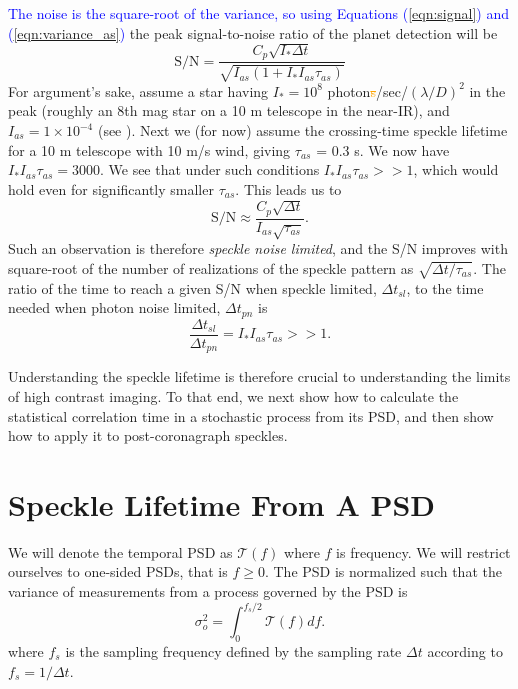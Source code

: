 \documentclass[10pt,preprint]{aastex631}
\newcommand{\jrmadd}[1]{\textcolor{blue}{#1}}
\newcommand{\ogrmv}[1]{\textcolor{orange}{\sout{#1}}}
\begin{document}
\jrmadd{The noise is the square-root of the variance, so using Equations (\ref{eqn:signal}) and  (\ref{eqn:variance_as})} the peak signal-to-noise ratio of the planet detection will be
\begin{equation}
\mbox{S/N} = \frac{C_p \sqrt{I_* \Delta t}}{ \sqrt{I_{as} (1 + I_*I_{as} \tau_{as})}} 
\end{equation}
For argument's sake, assume a star having $I_* = 10^8$ photon\ogrmv{s}/sec/$(\lambda/D)^2$ in the peak (roughly an 8th mag star on a 10 m telescope in the near-IR), and $I_{as} = 1\times10^{-4}$ (see \citet{2018JATIS...4a9001M}).  Next we (for now) assume the \citet{2005SPIE.5903..170M} crossing-time speckle lifetime for a 10 m telescope with 10 m/s wind, giving $\tau_{as}$ = 0.3 s.  We now have $I_*I_{as} \tau_{as} = 3000$.  We see that under such conditions  $I_*I_{as} \tau_{as} >> 1$, which would hold even for significantly smaller $\tau_{as}$.  This leads us to
\begin{equation}
\mbox{S/N} \approx \frac{C_p \sqrt{\Delta t}}{ I_{as} \sqrt{\tau_{as}}}. 
\end{equation}
Such an observation is therefore \emph{speckle noise limited}, and the S/N improves with square-root of the number of realizations of the speckle pattern as $\sqrt{\Delta t/ \tau_{as}}$.  The ratio of the time to reach a given S/N when speckle limited, $\Delta t_{sl}$, to the time needed when photon noise limited, $\Delta t_{pn}$ is
\begin{equation}
\frac{\Delta t_{sl}}{\Delta t_{pn}} = I_*I_{as} \tau_{as} >> 1.
\label{eqn:relexptime}
\end{equation}

Understanding the speckle lifetime is therefore crucial to understanding the limits of high contrast imaging.  To that end, we next show how to calculate the statistical correlation time in a stochastic process from its PSD, and then show how to apply it to post-coronagraph speckles.


\section{Speckle Lifetime From A PSD}
\label{sec:psd_lifetime}
We will denote the temporal PSD as $\mathcal{T}(f)$ where $f$ is frequency.  We will restrict ourselves to one-sided PSDs, that is $f \ge 0$.  The PSD is normalized such that the variance of measurements from a process governed by the PSD is
\begin{equation}
\sigma_o^2 = \int_{0}^{f_s/2} \mathcal{T}(f) df.
\label{eqn:process_var}
\end{equation}
where $f_s$ is the sampling frequency defined by the sampling rate $\Delta t$ according to $f_s = 1/\Delta t$.
    
\end{document}
